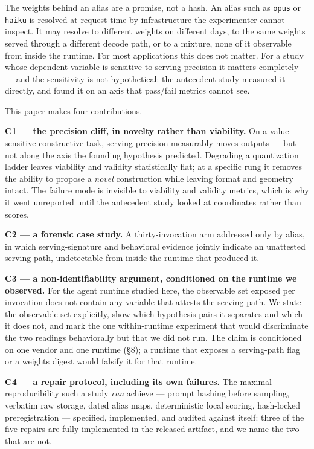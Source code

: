 \documentclass[11pt]{article}
\begin{document}
The weights behind an alias are a promise, not a hash. An alias such as \texttt{opus} or
\texttt{haiku} is resolved at request time by infrastructure the experimenter cannot inspect.
It may resolve to different weights on different days, to the same weights served
through a different decode path, or to a mixture, none of it observable from inside the
runtime. For most applications this does not matter. For a study whose dependent
variable is sensitive to serving precision it matters completely --- and the sensitivity
is not hypothetical: the antecedent study measured it directly, and found it on an axis
that pass/fail metrics cannot see.

This paper makes four contributions.

\textbf{C1 --- the precision cliff, in novelty rather than viability.} On a value-sensitive
constructive task, serving precision measurably moves outputs --- but not along the axis
the founding hypothesis predicted. Degrading a quantization ladder leaves viability and
validity statistically flat; at a specific rung it removes the ability to propose a
\emph{novel} construction while leaving format and geometry intact. The failure mode is
invisible to viability and validity metrics, which is why it went unreported until the
antecedent study looked at coordinates rather than scores.

\textbf{C2 --- a forensic case study.} A thirty-invocation arm addressed only by alias, in
which serving-signature and behavioral evidence jointly indicate an unattested serving
path, undetectable from inside the runtime that produced it.

\textbf{C3 --- a non-identifiability argument, conditioned on the runtime we observed.} For the
agent runtime studied here, the observable set exposed per invocation does not contain
any variable that attests the serving path. We state the observable set explicitly, show
which hypothesis pairs it separates and which it does not, and mark the one within-runtime
experiment that would discriminate the two readings behaviorally but that we did not run.
The claim is conditioned on one vendor and one runtime (\S8); a runtime that exposes a
serving-path flag or a weights digest would falsify it for that runtime.

\textbf{C4 --- a repair protocol, including its own failures.} The maximal reproducibility such
a study \emph{can} achieve --- prompt hashing before sampling, verbatim raw storage, dated alias
maps, deterministic local scoring, hash-locked preregistration --- specified, implemented,
and audited against itself: three of the five repairs are fully implemented in the
released artifact, and we name the two that are not.
\end{document}

